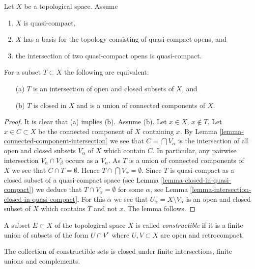 \begin{lemma}
\label{lemma-closed-union-connected-components}
Let $X$ be a topological space.
Assume
\begin{enumerate}
\item $X$ is quasi-compact,
\item $X$ has a basis for the topology consisting of quasi-compact opens, and
\item the intersection of two quasi-compact opens is quasi-compact.
\end{enumerate}
For a subset $T \subset X$ the following are equivalent:
\begin{enumerate}
\item[(a)] $T$ is an intersection of open and closed subsets of $X$, and
\item[(b)] $T$ is closed in $X$ and is a union of connected components of $X$.
\end{enumerate}
\end{lemma}

\begin{proof}
It is clear that (a) implies (b).
Assume (b). Let $x \in X$, $x \not \in T$. Let $x \in C \subset X$
be the connected component of $X$ containing $x$. By
Lemma \ref{lemma-connected-component-intersection}
we see that $C = \bigcap V_\alpha$ is the intersection of all open and
closed subsets $V_\alpha$ of $X$ which contain $C$.
In particular, any pairwise intersection $V_\alpha \cap V_\beta$
occurs as a $V_\alpha$.
As $T$ is a union of connected components
of $X$ we see that $C \cap T = \emptyset$. Hence
$T \cap \bigcap V_\alpha = \emptyset$. Since $T$ is quasi-compact as a
closed subset of a quasi-compact space (see
Lemma \ref{lemma-closed-in-quasi-compact})
we deduce that $T \cap V_\alpha = \emptyset$ for some $\alpha$, see
Lemma \ref{lemma-intersection-closed-in-quasi-compact}.
For this $\alpha$ we see that $U_\alpha = X \setminus V_\alpha$
is an open and closed subset of $X$ which contains $T$ and not $x$.
The lemma follows.
\end{proof}

\begin{definition}
\label{definition-constructible}
A subset $E \subset X$ of the topological space $X$ is called
{\it constructible} if it is a finite union of subsets
of the form $U \cap V^c$ where $U, V \subset X$ are open and
retrocompact.
\end{definition}

\begin{lemma}
\label{lemma-constructible}
The collection of constructible sets is closed under
finite intersections, finite unions and complements.
\end{lemma}

